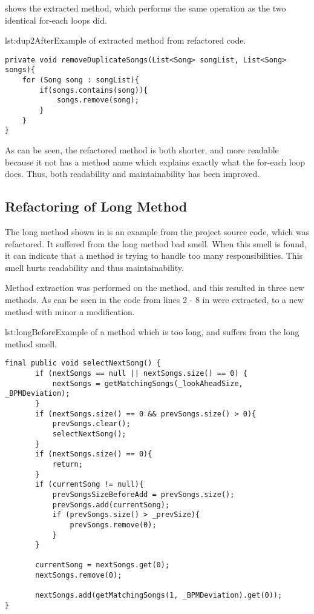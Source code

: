  shows the extracted method, which performs the same operation as the two identical for-each loops did.

\begin{code}{lst:dup2After}{Example of extracted method from refactored code.}
\begin{lstlisting}
private void removeDuplicateSongs(List<Song> songList, List<Song> songs){
    for (Song song : songList){
        if(songs.contains(song)){
            songs.remove(song);
        }
    }
}
\end{lstlisting}
\end{code}

As can be seen, the refactored method is both shorter, and more readable because it not has a method name which explains exactly what the for-each loop does. Thus, both readability and maintainability has been improved.
\subsection{Refactoring of Long Method}
The long method shown in  is an example from the project source code, which was refactored. It suffered from the long method bad smell. When this smell is found, it can indicate that a method is trying to handle too many responsibilities. This smell hurts readability and thus maintainability.

Method extraction was performed on the method, and this resulted in three new methods. As can be seen in  the code from lines 2 - 8 in 
 were extracted, to a new method with minor a modification. 

\begin{code}{lst:longBefore}{Example of a method which is too long, and suffers from the long method smell.}
\begin{lstlisting}
final public void selectNextSong() {
       if (nextSongs == null || nextSongs.size() == 0) {
           nextSongs = getMatchingSongs(_lookAheadSize, _BPMDeviation);
       }
       if (nextSongs.size() == 0 && prevSongs.size() > 0){
           prevSongs.clear();
           selectNextSong();
       }
       if (nextSongs.size() == 0){
           return; 
       }
       if (currentSong != null){
           prevSongsSizeBeforeAdd = prevSongs.size();
           prevSongs.add(currentSong);
           if (prevSongs.size() > _prevSize){
               prevSongs.remove(0);
           }
       }

       currentSong = nextSongs.get(0);
       nextSongs.remove(0);

       nextSongs.add(getMatchingSongs(1, _BPMDeviation).get(0));
}
\end{lstlisting}
\end{code}

